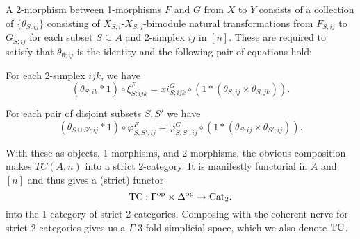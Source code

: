 \documentclass{amsart}
\begin{document}
\begin{list}{(TC1M)}{}
\begin{figure}[ht]
\begin{center}
		\end{center}
		\label{fig:EqnSSSijMorphism}
	\end{figure}
\end{list}
A 2-morphism between 1-morphisms $F$ and $G$ from $X$ to $Y$ consists of a collection of $\{ \theta_{S;ij} \}$ consisting of $X_{S;i}$-$X_{S;j}$-bimodule natural transformations from $F_{S;ij}$ to $G_{S;ij}$ for each subset $S \subseteq A$ and 2-simplex $ij$ in $[n]$. These are required to satisfy that $\theta_{\emptyset;ij}$ is the identity and the following pair of equations hold:
\begin{list}{(TC2M)}{}
	\item For each 2-simplex $ijk$, we have
	\begin{equation*}
		(\theta_{S; ik} * 1) \circ \xi^F_{S; ijk} = xi^G_{S;ijk} \circ (1 * (\theta_{S; ij} \times \theta_{S; jk})).
	\end{equation*}
	\item For each pair of disjoint subsets $S, S'$ we have
	\begin{equation*}
		(\theta_{S \cup S'; ij} * 1) \circ \varphi^F_{S, S'; ij} = \varphi^G_{S,S';ij} \circ (1*(\theta_{S;ij} \times \theta_{S';ij})).
	\end{equation*}
\end{list}
With these as objects, 1-morphisms, and 2-morphisms, the obvious composition makes $TC(A,n)$ into a strict $2$-category. It is manifestly functorial in $A$ and $[n]$ and thus gives a (strict) functor 
\begin{equation*}
	\mathrm{TC}: \Gamma^\textrm{op} \times \Delta^\textrm{op} \to \mathrm{Cat}_2.
\end{equation*}
into the 1-category of strict 2-categories. Composing with the coherent nerve for strict 2-categories gives us a $\Gamma$-3-fold simplicial space, which we also denote $\mathrm{TC}$.
\end{document}

